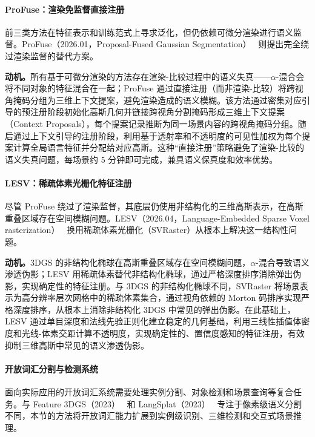 \paragraph{ProFuse：渲染免监督直接注册} 前三类方法在特征表示和训练范式上寻求泛化，但仍依赖可微分渲染进行语义监督。ProFuse（2026.01，Proposal-Fused Gaussian Segmentation）~\cite{2601_04754} 则提出完全绕过渲染监督的替代方案。

\textbf{动机。}所有基于可微分渲染的方法存在渲染-比较过程中的语义失真——$\alpha$-混合会将不同对象的特征混合在一起；ProFuse 通过直接注册（而非渲染-比较）将跨视角掩码分组为三维上下文提案，避免渲染造成的语义模糊。该方法通过密集对应引导的预注册阶段初始化高斯几何并链接跨视角分割掩码形成三维上下文提案（Context Proposals），每个提案记录推断为同一场景内容的跨视角掩码分组。随后通过上下文引导的注册阶段，利用基于透射率和不透明度的可见性加权为每个提案计算全局语言特征并分配给对应高斯。这种``直接注册''策略避免了渲染-比较的语义失真问题，每场景约 5 分钟即可完成，兼具语义保真度和效率优势。

\paragraph{LESV：稀疏体素光栅化特征注册} 尽管 ProFuse 绕过了渲染监督，其底层仍使用非结构化的三维高斯表示，在高斯重叠区域存在空间模糊问题。LESV（2026.04，Language-Embedded Sparse Voxel rasterization）~\cite{2604_01388} 换用稀疏体素光栅化（SVRaster）从根本上解决这一结构性问题。

\textbf{动机。}3DGS 的非结构化椭球在高斯重叠区域存在空间模糊问题，$\alpha$-混合导致语义渗透伪影；LESV 用稀疏体素替代非结构化椭球，通过严格深度排序消除弹出伪影，实现确定性的特征注册。与 3DGS 的非结构化椭球不同，SVRaster 将场景表示为高分辨率层次网格中的稀疏体素集合，通过视角依赖的 Morton 码排序实现严格深度排序，从根本上消除非结构化 3DGS 中常见的弹出伪影。在此基础上，LESV 通过单目深度和法线先验正则化建立稳定的几何基础，利用三线性插值体密度和光线-体素交距计算不透明度，实现确定性的、置信度感知的特征注册，有效抑制三维高斯中常见的语义渗透伪影。

\paragraph{开放词汇分割与检测系统}

面向实际应用的开放词汇系统需要处理实例分割、对象检测和场景查询等复合任务。与 Feature 3DGS（2023）~\cite{feature3dgs} 和 LangSplat（2023）~\cite{langsplat} 专注于像素级语义分割不同，本节的方法将开放词汇能力扩展到实例级识别、三维检测和交互式场景推理。

